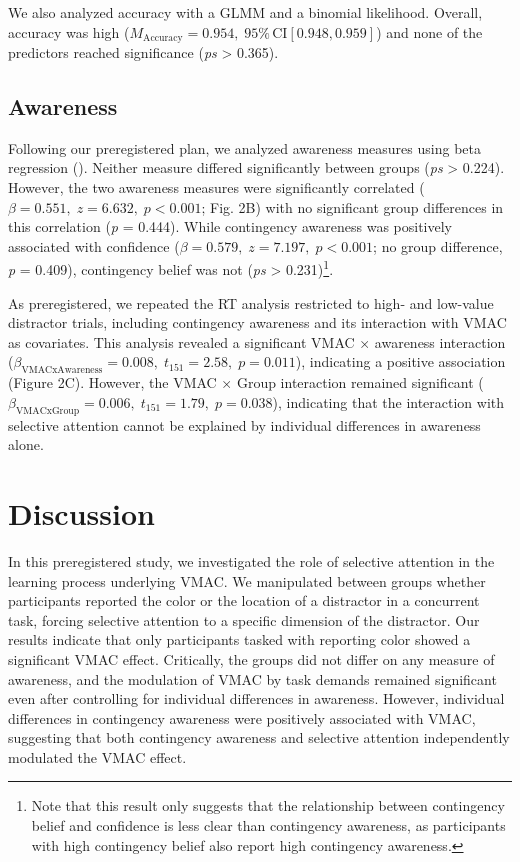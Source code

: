 \documentclass[
  jou,
  floatsintext,
  longtable,
  nolmodern,
  notxfonts,
  notimes,
  colorlinks=true,linkcolor=blue,citecolor=blue,urlcolor=blue]{apa7}
\begin{document}
We also analyzed accuracy with a GLMM and a binomial likelihood.
Overall, accuracy was high
(\(M_{\text{Accuracy}} = 0.954, \;95\%\,\text{CI}[0.948, 0.959]\)) and
none of the predictors reached significance (\emph{ps} \textgreater{}
0.365).

\subsection{Awareness}\label{awareness}

Following our preregistered plan, we analyzed awareness measures using
beta regression (). Neither measure differed significantly between groups (\emph{ps}
\textgreater{} 0.224). However, the two awareness measures were
significantly correlated (\(\beta = 0.551, \; z = 6.632, \; p < 0.001\);
Fig. 2B) with no significant group differences in this correlation
(\emph{p} = 0.444). While contingency awareness was positively
associated with confidence
(\(\beta = 0.579, \; z = 7.197, \; p < 0.001\); no group difference,
\emph{p} = 0.409), contingency belief was not (\emph{ps} \textgreater{}
0.231)\footnote{Note that this result only suggests that the
  relationship between contingency belief and confidence is less clear
  than contingency awareness, as participants with high contingency
  belief also report high contingency awareness.}.

As preregistered, we repeated the RT analysis restricted to high- and
low-value distractor trials, including contingency awareness and its
interaction with VMAC as covariates. This analysis revealed a
significant VMAC × awareness interaction
(\(\beta_{\mathrm{VMAC x Awareness}} = 0.008, \; t_{151} = 2.58, \; p = 0.011\)),
indicating a positive association (Figure 2C). However, the VMAC × Group
interaction remained significant
(\(\beta_{\mathrm{VMAC x Group}} = 0.006, \; t_{151} = 1.79, \; p = 0.038\)),
indicating that the interaction with selective attention cannot be
explained by individual differences in awareness alone.

\section{Discussion}\label{discussion}

In this preregistered study, we investigated the role of selective
attention in the learning process underlying VMAC. We manipulated
between groups whether participants reported the color or the location
of a distractor in a concurrent task, forcing selective attention to a
specific dimension of the distractor. Our results indicate that only
participants tasked with reporting color showed a significant VMAC
effect. Critically, the groups did not differ on any measure of
awareness, and the modulation of VMAC by task demands remained
significant even after controlling for individual differences in
awareness. However, individual differences in contingency awareness were
positively associated with VMAC, suggesting that both contingency
awareness and selective attention independently modulated the VMAC
effect.
\end{document}
